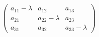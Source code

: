 \documentclass{article}
\begin{document}
\vspace*{\fill} \vspace*{-5ex}
$$
\left(\begin{array}{ccc}
a_{11}-\lambda & a_{12}&a_{13}\\
a_{21}& a_{22}-\lambda &a_{23}\\
a_{31}& a_{32}&a_{33}-\lambda
\end{array}\right)
$$

\vspace*{\fill}
\end{document}
